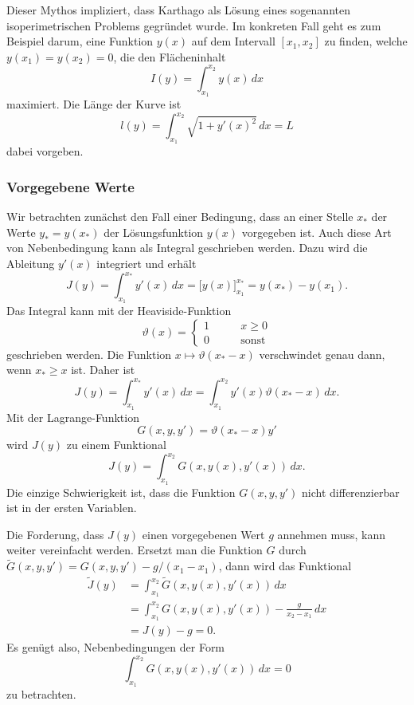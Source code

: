 Dieser Mythos impliziert, dass Karthago als Lösung eines sogenannten
isoperimetrischen Problems gegründet wurde.
%
Im konkreten Fall geht es zum Beispiel darum, eine Funktion $y(x)$
auf dem Intervall $[x_1,x_2]$ zu finden, welche $y(x_1)=y(x_2)=0$,
die den Flächeninhalt
\[
I(y)
=
\int_{x_1}^{x_2} y(x)\,dx
\]
maximiert.
Die Länge der Kurve ist
\[
l(y)
=
\int_{x_1}^{x_2}
\sqrt{1+y'(x)^2}
\,dx
=
L
\]
dabei vorgeben.

%
%
\subsubsection{Vorgegebene Werte}
Wir betrachten zunächst den Fall einer Bedingung, dass an einer Stelle
$x_*$ der Werte $y_*=y(x_*)$ der Lösungsfunktion $y(x)$ vorgegeben ist.
Auch diese Art von Nebenbedingung kann als Integral geschrieben werden.
Dazu wird die Ableitung $y'(x)$ integriert und erhält
\[
J(y)
=
\int_{x_1}^{x_*} y'(x)\,dx
=
\biggl[y(x)\biggr]_{x_1}^{x_*}
=
y(x_*)-y(x_1).
\]
Das Integral kann mit der Heaviside-Funktion
\begin{equation}
\vartheta(x)
=
\begin{cases}
1&\qquad x\ge 0\\
0&\qquad\text{sonst}
\end{cases}
\label{buch:nebenbedingungen:lagrangemult:eqn:heaviside}
\end{equation}
geschrieben werden.
Die Funktion $x\mapsto\vartheta(x_*-x)$ verschwindet genau dann,
wenn $x_*\ge x$ ist.
Daher ist
\[
J(y)
=
\int_{x_1}^{x_*} y'(x)\,dx
=
\int_{x_1}^{x_2} y'(x)\vartheta(x_*-x)\,dx.
\]
Mit der Lagrange-Funktion
\begin{equation}
G(x,y,y')
=
\vartheta(x_*-x)
y'
\label{buch:nebenbedingungen:lagrangemult:eqn:heavilagrange}
\end{equation}
wird $J(y)$ zu einem Funktional
\[
J(y)
=
\int_{x_1}^{x_2}
G(x,y(x),y'(x))
\,dx.
\]
Die einzige Schwierigkeit ist, dass die Funktion $G(x,y,y')$ nicht
differenzierbar ist in der ersten Variablen.

Die Forderung, dass $J(y)$ einen vorgegebenen Wert $g$ annehmen muss,
kann weiter vereinfacht werden.
Ersetzt man die Funktion $G$ durch $\tilde{G}(x,y,y')=G(x,y,y')-g/(x_1-x_1)$,
dann wird das Funktional
\begin{align*}
\tilde{J}(y)
&=
\int_{x_1}^{x_2}
\tilde{G}(x,y(x),y'(x))\,dx
\\
&=
\int_{x_1}^{x_2} G(x,y(x),y'(x)) - \frac{g}{x_2-x_1}\,dx
\\
&=
J(y) - g
=
0.
\end{align*}
Es genügt also, Nebenbedingungen der Form
\[
\int_{x_1}^{x_2} G(x,y(x),y'(x))\,dx = 0
\]
zu betrachten.

